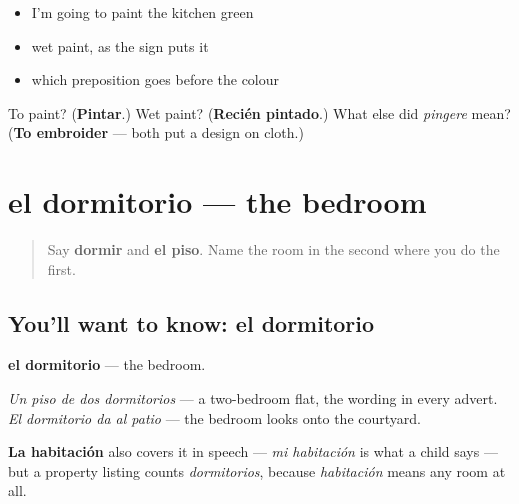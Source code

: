 \begin{itemize}
\raggedright
  \item I'm going to paint the kitchen green
  \item wet paint, as the sign puts it
  \item which preposition goes before the colour
\end{itemize}

\begin{tcolorbox}[breakable,colback=teal!4,colframe=teal!35!black,title={Before you move on}]
To paint? (\textbf{Pintar}.) Wet paint? (\textbf{Recién pintado}.) What else did \emph{pingere} mean? (\textbf{To embroider} — both put a design on cloth.)
\end{tcolorbox}
\section[el dormitorio]{el dormitorio — the bedroom}

\label{lesson:ES-C455-dormitorio}



\begin{quote}
Say \textbf{dormir} and \textbf{el piso}. Name the room in the second where you do the first.
\end{quote}

\subsection*{You'll want to know: el dormitorio}
\textbf{el dormitorio} — the bedroom.

\emph{Un piso de dos dormitorios} — a two-bedroom flat, the wording in every advert. \emph{El dormitorio da al patio} — the bedroom looks onto the courtyard.

\textbf{La habitación} also covers it in speech — \emph{mi habitación} is what a child says — but a property listing counts \emph{dormitorios}, because \emph{habitación} means any room at all.


